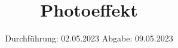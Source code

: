 

%

\subject{V500}
\title{Photoeffekt}
\date{%
  Durchführung: 02.05.2023
  \hspace{3em}
  Abgabe: 09.05.2023
}


\setlength{\parindent}{0pt} %

\maketitle
\thispagestyle{empty}
\tableofcontents
\newpage



%



\printbibliography{}





